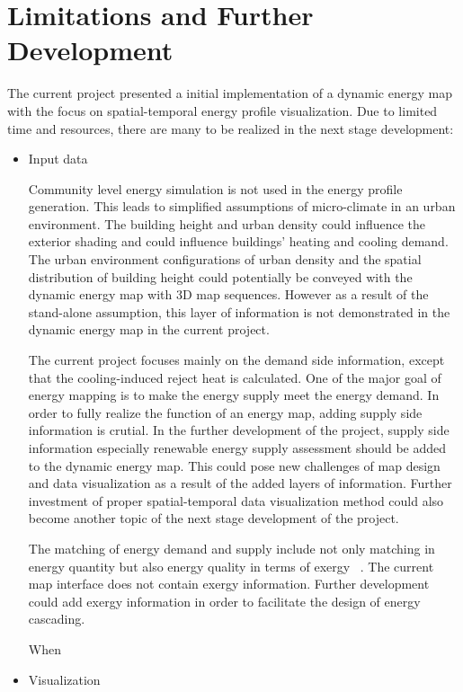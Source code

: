 \section{Limitations and Further Development}
The current project presented a initial implementation of a dynamic
energy map with the focus on spatial-temporal energy profile
visualization. Due to limited time and resources, there are many to be
realized in the next stage development:

\begin{itemize}
\item Input data

  Community level energy simulation is not used in the energy profile
  generation. This leads to simplified assumptions of micro-climate in
  an urban environment. The building height and urban density could
  influence the exterior shading and could influence buildings'
  heating and cooling demand. The urban environment configurations of
  urban density and the spatial distribution of building height could
  potentially be conveyed with the dynamic energy map with 3D map
  sequences. However as a result of the stand-alone assumption, this
  layer of information is not demonstrated in the dynamic energy map
  in the current project.

  The current project focuses mainly on the demand side information,
  except that the cooling-induced reject heat is calculated. One of
  the major goal of energy mapping is to make the energy supply meet
  the energy demand. In order to fully realize the function of an
  energy map, adding supply side information is crutial. In the
  further development of the project, supply side information
  especially renewable energy supply assessment should be added to the
  dynamic energy map. This could pose new challenges of map design and
  data visualization as a result of the added layers of
  information. Further investment of proper spatial-temporal data
  visualization method could also become another topic of the next
  stage development of the project.

  The matching of energy demand and supply include not only matching
  in energy quantity but also energy quality in terms of exergy
  ~\cite{Dobbelsteen2013}. The current map interface does not contain
  exergy information. Further development could add exergy information
  in order to facilitate the design of energy cascading.

  When 

\item Visualization


\end{itemize}

